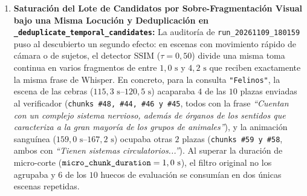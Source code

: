 \begin{enumerate}
\begin{itemize}
    \end{itemize}
    Entretanto, los fragmentos intermedios del documental ($76\text{ s--}193\text{ s}$, que muestran cebras, primates, ardillas, caballos o vasos sanguíneos) contienen oraciones con alta densidad de términos biológicos (\textit{``caracteriza a la gran mayoría de los grupos de animales''}, \textit{``organismos eucariotas''}), alcanzando similitudes de texto de $\mathbf{0,3734\text{--}0,3899}$ frente al término taxonómico \texttt{"Felinos"} y ocupando los primeros $30$ puestos de Qdrant.
    Como consecuencia, los tres felinos iniciales quedan fuera del corte de candidatos ($\text{\texttt{fetch\_k}} = 10$) que pasan al verificador de Etapa 2.

    \item \textbf{Saturación del Lote de Candidatos por Sobre-Fragmentación Visual bajo una Misma Locución y Deduplicación en \texttt{\_deduplicate\_temporal\_candidates}:}
    La auditoría de \texttt{run\_20261109\_180159} puso al descubierto un segundo efecto: en escenas con movimiento rápido de cámara o de sujetos, el detector SSIM ($\tau = 0,50$) divide una misma toma continua en varios fragmentos de entre $1,0\text{ s}$ y $4,2\text{ s}$ que reciben exactamente la misma frase de Whisper.
    En concreto, para la consulta \texttt{"Felinos"}, la escena de las cebras ($115,3\text{ s--}120,5\text{ s}$) acaparaba $4$ de las $10$ plazas enviadas al verificador (\texttt{chunks \#48, \#44, \#46 y \#45}, todos con la frase \textit{``Cuentan con un complejo sistema nervioso, además de órganos de los sentidos que caracteriza a la gran mayoría de los grupos de animales''}), y la animación sanguínea ($159,0\text{ s--}167,2\text{ s}$) ocupaba otras $2$ plazas (\texttt{chunks \#59 y \#58}, ambos con \textit{``Tienen sistemas circulatorios...''}).
    Al superar la duración de micro-corte ($\text{\texttt{micro\_chunk\_duration}} = 1,0\text{ s}$), el filtro original no los agrupaba y $6$ de los $10$ huecos de evaluación se consumían en dos únicas escenas repetidas.


\end{enumerate}
